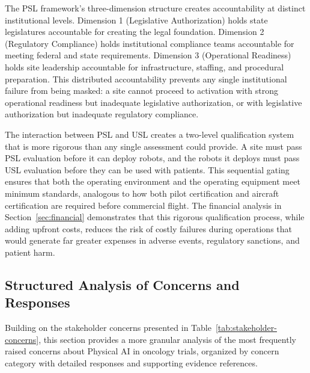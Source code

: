 The PSL framework's three-dimension structure creates accountability at
distinct institutional levels. Dimension 1 (Legislative Authorization) holds
state legislatures accountable for creating the legal foundation. Dimension 2
(Regulatory Compliance) holds institutional compliance teams accountable for
meeting federal and state requirements. Dimension 3 (Operational Readiness)
holds site leadership accountable for infrastructure, staffing, and procedural
preparation. This distributed accountability prevents any single institutional
failure from being masked: a site cannot proceed to activation with strong
operational readiness but inadequate legislative authorization, or with
legislative authorization but inadequate regulatory compliance.

The interaction between PSL and USL creates a two-level qualification system
that is more rigorous than any single assessment could provide. A site must
pass PSL evaluation before it can deploy robots, and the robots it deploys
must pass USL evaluation before they can be used with patients. This
sequential gating ensures that both the operating environment and the
operating equipment meet minimum standards, analogous to how both pilot
certification and aircraft certification are required before commercial
flight. The financial analysis in Section~\ref{sec:financial} demonstrates
that this rigorous qualification process, while adding upfront costs, reduces
the risk of costly failures during operations that would generate far greater
expenses in adverse events, regulatory sanctions, and patient harm.

\subsection{Structured Analysis of Concerns and Responses}
\label{subsec:discuss-structured-concerns}

Building on the stakeholder concerns presented in
Table~\ref{tab:stakeholder-concerns}, this section provides a more granular
analysis of the most frequently raised concerns about Physical AI in oncology
trials, organized by concern category with detailed responses and supporting
evidence references.


